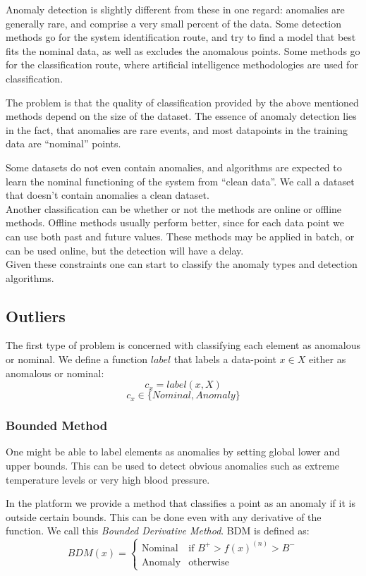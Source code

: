 \documentclass[a4paper, 10pt]{article}
\begin{document}
Anomaly detection is slightly different from these in one regard: anomalies are generally rare, and comprise a very small percent of the data. Some detection methods go for the system identification route, and try to find a model that best fits the nominal data, as well as excludes the anomalous points. Some methods go for the classification route, where artificial intelligence methodologies are used for classification. 

The problem is that the quality of classification provided by the above mentioned methods depend on the size of the dataset. The essence of anomaly detection lies in the fact, that anomalies are rare events, and most datapoints in the training data are ``nominal'' points. 

Some datasets do not even contain anomalies, and algorithms are expected to learn the nominal functioning of the system from ``clean data''. We call a dataset that doesn't contain anomalies a clean dataset. \\

Another classification can be whether or not the methods are online or offline methods. Offline methods usually perform better, since for each data point we can use both past and future values. These methods may be applied in batch, or can be used online, but the detection will have a delay. \\

Given these constraints one can start to classify the anomaly types and detection algorithms.

\subsection{Outliers}

The first type of problem is concerned with classifying each element as anomalous or nominal. We define a function $label$ that labels a data-point $x \in X$ either as anomalous or nominal:
$$c_x = label(x,X)$$
$$c_x \in \{Nominal, Anomaly\}$$


\subsubsection{Bounded Method}

One might be able to label elements as anomalies by setting global lower and upper bounds. This can be used to detect obvious anomalies such as extreme temperature levels or very high blood pressure. 

In the platform we provide a method that classifies a point as an anomaly if it is outside certain bounds. This can be done even with any derivative of the function. We call this \emph{Bounded Derivative Method}. BDM is defined as:
$$
	BDM(x) = 
	\begin{cases}
       \text{Nominal} & \text{if } B^+ > f(x)^{(n)} > B^-\\
    	\text{Anomaly} & \text{otherwise}
    \end{cases}
$$
\end{document}
